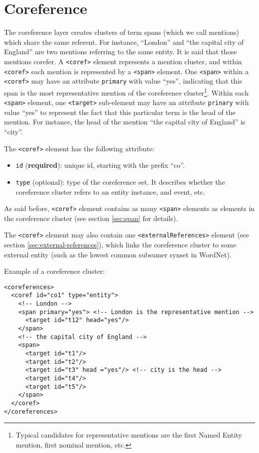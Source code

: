 
\section{Coreference}
\label{sec:coreference}

The coreference layer creates clusters of term spans (which we call
mentions) which share the same referent. For instance, ``London'' and ``the
capital city of England'' are two mentions referring to the same entity. It
is said that those mentions corefer.  A \texttt{<coref>} element represents
a mention cluster, and within \texttt{<coref>} each mention is represented
by a \texttt{<span>} element. One \texttt{<span>} within a \texttt{<coref>}
may have an attribute \texttt{primary} with value ``yes'', indicating that
this span is the most representative mention of the coreference
cluster\footnote{Typical candidates for representative mentions are the
  first Named Entity mention, first nominal mention, etc. }. Within each
\texttt{<span>} element, one \texttt{<target>} sub-element may have an
attribute \texttt{prinary} with value ``yes'' to represent the fact that
this particular term is the head of the mention. For instance, the head of
the mention ``the capital city of England'' is ``city''.

The \texttt{<coref>} element has the following attribute:
\begin{itemize}
\item \texttt{id} (\textbf{required}): unique id, starting with the prefix ``co''.
\item \texttt{type} (optional): type of the coreference set. It describes
  whether the coreference cluster refers to an entity instance, and event,
  etc.
\end{itemize}

As said before, \texttt{<coref>} element contains as many \texttt{<span>}
elements as elements in the coreference cluster (see section
\ref{sec:span} for details).

The \texttt{<coref>} element may also contain one
\texttt{<externalReferences>} element (see section
\ref{sec:external-references}), which links the coreference cluster to some
external entity (such as the lowest common subsumer synset in WordNet).

Example of a coreference cluster:

\begin{Verbatim}[fontsize=\small]
<coreferences>
  <coref id="co1" type="entity">
    <!-- London -->
    <span primary="yes"> <!-- London is the representative mention -->
      <target id="t12" head="yes"/>
    </span>
    <!-- the capital city of England -->
    <span>
      <target id="t1"/>
      <target id="t2"/>
      <target id="t3" head ="yes"/> <!-- city is the head -->
      <target id="t4"/>
      <target id="t5"/>
    </span>
  </coref>
</coreferences>
\end{Verbatim}


